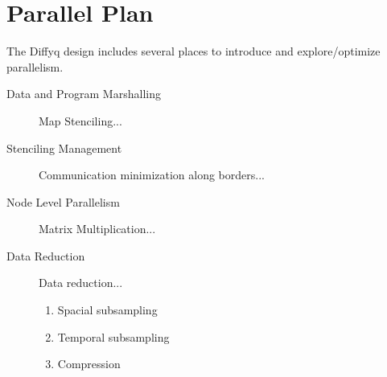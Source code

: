 \section{Parallel Plan}

The Diffyq design includes several places to introduce and explore/optimize parallelism.

\begin{description}
\item[Data and Program Marshalling] Map Stenciling...
\item[Stenciling Management] Communication minimization along borders...
\item[Node Level Parallelism] Matrix Multiplication...
\item[Data Reduction] Data reduction...
\begin{enumerate}
  \item Spacial subsampling
  \item Temporal subsampling
  \item Compression
\end{enumerate}
\end{description}



